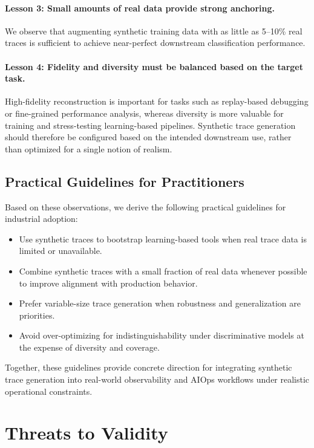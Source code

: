 \documentclass[sigconf,review]{acmart}
\begin{document}
\paragraph{Lesson 3: Small amounts of real data provide strong anchoring.}
We observe that augmenting synthetic training data with as little as 5--10\% real traces is sufficient to achieve near-perfect downstream classification performance.


\paragraph{Lesson 4: Fidelity and diversity must be balanced based on the target task.}
High-fidelity reconstruction is important for tasks such as replay-based debugging or fine-grained performance analysis, whereas diversity is more valuable for training and stress-testing learning-based pipelines. Synthetic trace generation should therefore be configured based on the intended downstream use, rather than optimized for a single notion of realism.

\subsection{Practical Guidelines for Practitioners}

Based on these observations, we derive the following practical guidelines for industrial adoption:

\begin{itemize}
    \item Use synthetic traces to bootstrap learning-based tools when real trace data is limited or unavailable.
    \item Combine synthetic traces with a small fraction of real data whenever possible to improve alignment with production behavior.
    \item Prefer variable-size trace generation when robustness and generalization are priorities.
    \item Avoid over-optimizing for indistinguishability under discriminative models at the expense of diversity and coverage.
\end{itemize}

Together, these guidelines provide concrete direction for integrating synthetic trace generation into real-world observability and AIOps workflows under realistic operational constraints.

\section{Threats to Validity}
\end{document}
